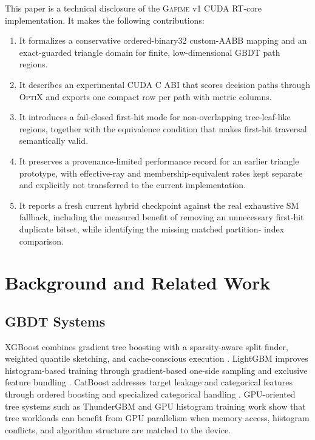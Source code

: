 \documentclass[11pt]{article}
\newcommand{\gafime}{\textsc{Gafime}\xspace}
\newcommand{\optix}{\textsc{OptiX}\xspace}
\begin{document}
This paper is a technical disclosure of the \gafime v1 CUDA RT-core
implementation. It makes the following contributions:

\begin{enumerate}
  \item It formalizes a conservative ordered-binary32 custom-AABB mapping and
  an exact-guarded triangle domain for finite, low-dimensional GBDT path
  regions.
  \item It describes an experimental CUDA C ABI that scores decision paths
  through \optix and exports one compact row per path with metric columns.
  \item It introduces a fail-closed first-hit mode for non-overlapping
  tree-leaf-like regions, together with the equivalence condition that makes
  first-hit traversal semantically valid.
  \item It preserves a provenance-limited performance record for an earlier
  triangle prototype, with effective-ray and membership-equivalent rates kept
  separate and explicitly not transferred to the current implementation.
  \item It reports a fresh current hybrid checkpoint against the real exhaustive
  SM fallback, including the measured benefit of removing an unnecessary
  first-hit duplicate bitset, while identifying the missing matched partition-
  index comparison.
\end{enumerate}

\section{Background and Related Work}

\subsection{GBDT Systems}

XGBoost combines gradient tree boosting with a sparsity-aware split finder,
weighted quantile sketching, and cache-conscious execution
\cite{chen2016xgboost}. LightGBM improves histogram-based training through
gradient-based one-side sampling and exclusive feature bundling
\cite{ke2017lightgbm}. CatBoost addresses target leakage and categorical
features through ordered boosting and specialized categorical handling
\cite{prokhorenkova2018catboost}. GPU-oriented tree systems such as
ThunderGBM \cite{wen2020thundergbm} and GPU histogram training work
\cite{zhang2017gputreeboosting} show that tree workloads can benefit from GPU
parallelism when memory access, histogram conflicts, and algorithm structure
are matched to the device.
\end{document}
